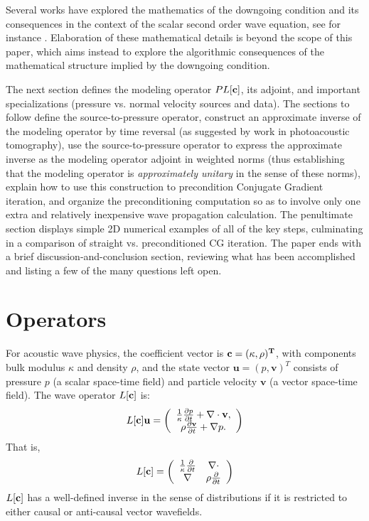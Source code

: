 \documentclass[georeport,12pt]{geophysics}
\newcommand{\bv}{\mathbf{v}}
\newcommand{\bu}{\mathbf{u}}
\begin{document}
Several works have explored the mathematics of the
downgoing condition and its consequences in the context of the scalar second order wave equation, see for instance
\cite{Payn:75,Symes:83,Lasi:86,LasLionsTrig:86,Lasi:87, BaoSy:91b}. 
Elaboration of these mathematical details is beyond the scope of this
paper, which aims instead to explore the algorithmic
consequences of the mathematical structure implied by the downgoing
condition.

The next section defines the modeling operator $PL[{\bf c}]$, its
adjoint, and important specializations (pressure vs. normal velocity
sources and data). The sections to follow define the
source-to-pressure operator, construct an approximate inverse of the
modeling operator by time reversal (as suggested by work in
photoacoustic tomography), use the source-to-pressure operator to
express the approximate inverse as the modeling operator adjoint in
weighted norms (thus establishing that the modeling operator is {\em approximately
  unitary} in the sense of these norms), explain how to use this
construction to precondition Conjugate Gradient iteration, and
organize the preconditioning computation so as to involve only one
extra and relatively inexpensive
wave propagation calculation. The penultimate section displays simple
2D numerical examples of all of the key steps, culminating in a
comparison of straight vs. preconditioned CG iteration. The paper ends
with a brief discussion-and-conclusion section, reviewing what has
been accomplished and listing a few of the many questions left open.

\section{Operators}

For acoustic wave physics, the coefficient vector is
$\bf{c}=(\kappa,\rho)^T$, with components bulk modulus $\kappa$ and
density $\rho$, and the state vector $\bu=(p,\bv)^T$ consists of
pressure $p$ (a scalar space-time field) and particle velocity $\bv$
(a vector space-time field). The wave operator $L[\bf{c}]$ is:
\begin{equation}
\label{eqn:aweop}
L[\bf{c}]\bf{u} = 
\left(
\begin{array}{c}
\frac{1}{\kappa}\frac{\partial p}{\partial t}  + \nabla \cdot \bv, \\
\rho\frac{\partial \bv}{\partial t} + \nabla p.
\end{array}
\right) 
\end{equation}
That is,
\begin{equation}
  \label{eqn:awemat}
  L[{\bf c}] = \left(
    \begin{array}{cc}
      \frac{1}{\kappa}\frac{\partial}{\partial t} & \nabla \cdot \\
      \nabla & \rho \frac{\partial}{\partial t}
    \end{array}
  \right)
\end{equation}
$L[{\bf c}]$ has a well-defined inverse in the sense of distributions
if it is restricted to either causal or anti-causal vector wavefields.
\end{document}

